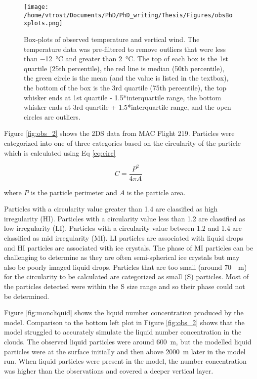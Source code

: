 \begin{figure}[H]
	\centering
	\texttt{[image: /home/vtrost/Documents/PhD/PhD\_writing/Thesis/Figures/obsBoxplots.png]}
	\caption{Box-plots of observed temperature and vertical wind. The temperature data was pre-filtered to remove outliers that were less than \SI{-12}{\degreeCelsius} and greater than \SI{2}{\degreeCelsius}. The top of each box is the 1st quartile (25th percentile), the red line is median (50th percentile), the green circle is the mean (and the value is listed in the textbox), the bottom of the box is the 3rd quartile (75th percentile), the top whisker ends at 1st quartile - 1.5*interquartile range, the bottom whisker ends at 3rd quartile + 1.5*interquartile range, and the open circles are outliers.}
	\label{fig:obsBoxplot}
\end{figure}

Figure \ref{fig:obs_2} shows the 2DS data from MAC Flight 219. Particles were categorized into one of three categories based on the circularity of the particle which is calculated using Eq \ref{eq:circ}

\begin{equation} \label{eq:circ}
C = \frac{P^{2}}{4 \pi A}
\end{equation}

where $P$ is the particle perimeter and $A$ is the particle area. \citep{oshea2017}

Particles with a circularity value greater than 1.4 are classified as high irregularity (HI). Particles with a circularity value less than 1.2 are classified as low irregularity (LI). Particles with a circularity value between 1.2 and 1.4 are classified as mid irregularity (MI). LI particles are associated with liquid drops and HI particles are associated with ice crystals. The phase of MI particles can be challenging to determine as they are often semi-spherical ice crystals but may also be poorly imaged liquid drops. Particles that are too small (around \SI{70}{\mu m}) for the circularity to be calculated are categorized as small (S) particles. Most of the particles detected were within the S size range and so their phase could not be determined. \citep{oshea2017}

Figure \ref{fig:moncliquid} shows the liquid number concentration produced by the model. Comparison to the bottom left plot in Figure \ref{fig:obs_2} shows that the model struggled to accurately simulate the liquid number concentration in the clouds. The observed liquid particles were around \SI{600}{m}, but the modelled liquid particles were at the surface initially and then above \SI{2000}{m} later in the model run. When liquid particles were present in the model, the number concentration was higher than the observations and covered a deeper vertical layer.

